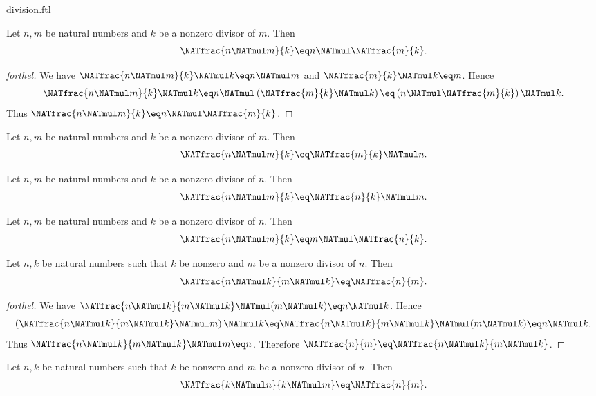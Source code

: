 \documentclass{stex}
\begin{document}
\begin{smodule}{division.ftl}
\begin{proposition}[forthel,id=ARITHMETIC_14_1203565412058488]
  Let $n, m$ be natural numbers and $k$ be a nonzero divisor of $m$.
  Then \[\NATfrac{n \NATmul m}{k} \eq n \NATmul \NATfrac{m}{k}.\]
\end{proposition}
\begin{proof}[forthel]
  We have $\NATfrac{n \NATmul m}{k} \NATmul k \eq n \NATmul m$ and $\NATfrac{m}{k} \NATmul k \eq m$.
  Hence
  \[  \NATfrac{n \NATmul m}{k} \NATmul k
      \eq n \NATmul \left( \NATfrac{m}{k} \NATmul k \right)
      \eq \left( n \NATmul \NATfrac{m}{k} \right) \NATmul k. \]
  Thus $\NATfrac{n \NATmul m}{k} \eq n \NATmul \NATfrac{m}{k}$.
\end{proof}

\begin{corollary}[forthel,id=ARITHMETIC_14_7985412544563256]
  Let $n, m$ be natural numbers and $k$ be a nonzero divisor of $m$.
  Then \[\NATfrac{n \NATmul m}{k} \eq \NATfrac{m}{k} \NATmul n.\]
\end{corollary}

\begin{corollary}[forthel,id=ARITHMETIC_14_5446124202158602]
  Let $n, m$ be natural numbers and $k$ be a nonzero divisor of $n$.
  Then \[\NATfrac{n \NATmul m}{k} \eq \NATfrac{n}{k} \NATmul m.\]
\end{corollary}

\begin{corollary}[forthel,id=ARITHMETIC_14_7751120023654896]
  Let $n, m$ be natural numbers and $k$ be a nonzero divisor of $n$.
  Then \[\NATfrac{n \NATmul m}{k} \eq m \NATmul \NATfrac{n}{k}.\]
\end{corollary}

\begin{proposition}[forthel,id=ARITHMETIC_14_0531254868745988]
  Let $n, k$ be natural numbers such that $k$ be nonzero and $m$ be a nonzero divisor of $n$.
  Then \[\NATfrac{n \NATmul k}{m \NATmul k} \eq \NATfrac{n}{m}.\]
\end{proposition}
\begin{proof}[forthel]
  We have $\NATfrac{n \NATmul k}{m \NATmul k} \NATmul (m \NATmul k) \eq n \NATmul k$.
  Hence
  \[  \left( \NATfrac{n \NATmul k}{m \NATmul k} \NATmul m \right) \NATmul k
      \eq \NATfrac{n \NATmul k}{m \NATmul k} \NATmul (m \NATmul k)
      \eq n \NATmul k. \]
  Thus $\NATfrac{n \NATmul k}{m \NATmul k} \NATmul m \eq n$.
  Therefore $\NATfrac{n}{m} \eq \NATfrac{n \NATmul k}{m \NATmul k}$.
\end{proof}

\begin{corollary}[forthel,id=ARITHMETIC_14_7954254458622034]
  Let $n, k$ be natural numbers such that $k$ be nonzero and $m$ be a nonzero divisor of $n$.
  Then \[\NATfrac{k \NATmul n}{k \NATmul m} \eq \NATfrac{n}{m}.\]
\end{corollary}
\end{smodule}
\end{document}
